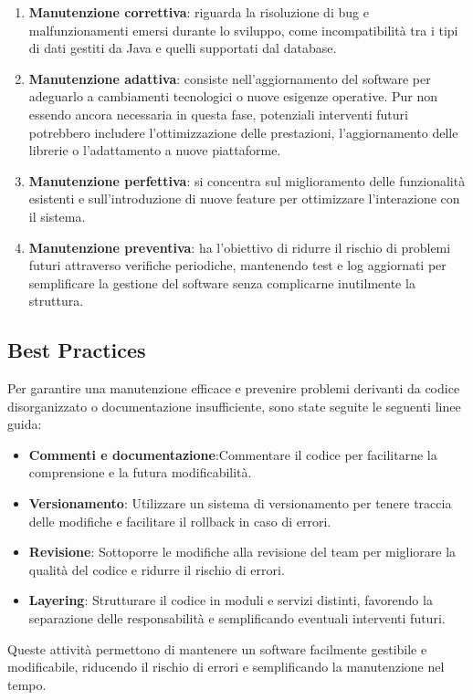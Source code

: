 \documentclass[a4paper,12pt]{article}
\begin{document}
\begin{enumerate}
    \item \textbf{Manutenzione correttiva}:  riguarda la risoluzione di bug e malfunzionamenti emersi durante lo sviluppo, come incompatibilità tra i tipi di dati gestiti da Java e quelli supportati dal database.
    
    \item \textbf{Manutenzione adattiva}: consiste nell'aggiornamento del software per adeguarlo a cambiamenti tecnologici o nuove esigenze operative. Pur non essendo ancora necessaria in questa fase, potenziali interventi futuri potrebbero includere l'ottimizzazione delle prestazioni, l'aggiornamento delle librerie o l'adattamento a nuove piattaforme.
    
    \item \textbf{Manutenzione perfettiva}: si concentra sul miglioramento delle funzionalità esistenti e sull'introduzione di nuove feature per ottimizzare l'interazione con il sistema.
    
    \item \textbf{Manutenzione preventiva}: ha l'obiettivo di ridurre il rischio di problemi futuri attraverso verifiche periodiche, mantenendo test e log aggiornati per semplificare la gestione del software senza complicarne inutilmente la struttura.
    
\end{enumerate}
\subsection{Best Practices}
Per garantire una manutenzione efficace e prevenire problemi derivanti da codice disorganizzato o documentazione insufficiente, sono state seguite le seguenti linee guida:
\begin{itemize}
    \item \textbf{Commenti e documentazione}:Commentare il codice per facilitarne la comprensione e la futura modificabilità.
    \item \textbf{Versionamento}: Utilizzare un sistema di versionamento per tenere traccia delle modifiche e facilitare il rollback in caso di errori.
    \item \textbf{Revisione}: Sottoporre le modifiche alla revisione del team per migliorare la qualità del codice e ridurre il rischio di errori.
    \item \textbf{Layering}: Strutturare il codice in moduli e servizi distinti, favorendo la separazione delle responsabilità e semplificando eventuali interventi futuri.
\end{itemize}
Queste attività permettono di mantenere un software facilmente gestibile e modificabile, riducendo il rischio di errori e semplificando la manutenzione nel tempo.
\end{document}
